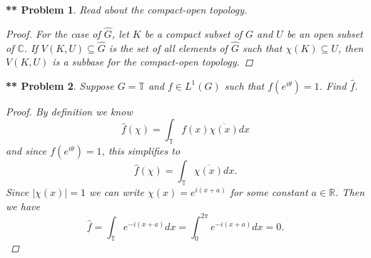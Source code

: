 \documentclass{article}
\newtheorem{**}{** Problem}
\begin{document}
\begin{**}
Read about the compact-open topology.
\begin{proof}
For the case of $\hat{G}$, let $K$ be a compact subset of $G$ and $U$ be an open subset of $\mathbb{C}$. If $V(K, U) \subseteq \hat{G}$ is the set of all elements of $\hat{G}$ such that $\chi(K) \subseteq U$, then $V(K,U)$ is a subbase for the compact-open topology.
\end{proof}
\end{**}

\begin{**}
Suppose $G = \mathbb{T}$ and $f \in L^1 (G)$ such that $f (e^{i \theta}) = 1$. Find $\hat{f}$.
\begin{proof}
By definition we know
\[
\hat{f} (\chi) = \int_{\mathbb{T}} f(x) \overline{\chi(x)} dx
\]
and since $f(e^{i \theta}) = 1$, this simplifies to
\[
\hat{f} (\chi) = \int_{\mathbb{T}} \overline{\chi(x)} dx.
\]
Since $|\chi(x)| = 1$ we can write $\chi(x) = e^{i(x+a)}$ for some constant $a \in \mathbb{R}$. Then we have
\[
\hat{f} = \int_{\mathbb{T}} e^{-i(x+a)}dx = \int_0^{2 \pi} e^{-i(x+a)}dx = 0.
\]
\end{proof}
\end{**}
\end{document}
